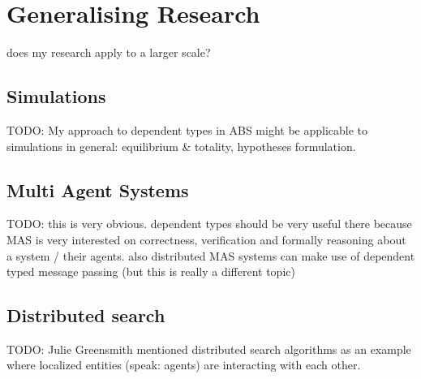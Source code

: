 \chapter{Generalising Research}
\label{chap:generalising}

does my research apply to a larger scale? 

\section{Simulations}
TODO: My approach to dependent types in ABS might be applicable to simulations in general: equilibrium \& totality, hypotheses formulation. 

\section{Multi Agent Systems}
TODO: this is very obvious.
dependent types should be very useful there because MAS is very interested on correctness, verification and formally reasoning about a system / their agents.
also distributed MAS systems can make use of dependent typed message passing (but this is really a different topic)

\section{Distributed search}
TODO: Julie Greensmith mentioned distributed search algorithms as an example where localized entities (speak: agents) are interacting with each other. 

